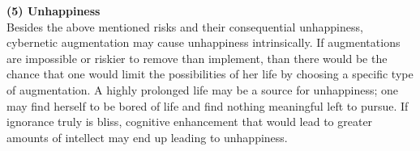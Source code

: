 \textbf{(5) Unhappiness} \\
Besides the above mentioned risks and their consequential unhappiness, cybernetic augmentation may cause unhappiness intrinsically. If augmentations are impossible or riskier to remove than implement, than there would be the chance that one would limit the possibilities of her life by choosing a specific type of augmentation. A highly prolonged life may be a source for unhappiness; one may find herself to be bored of life and find nothing meaningful left to pursue. If ignorance truly is bliss, cognitive enhancement that would lead to greater amounts of intellect may end up leading to unhappiness.




%
%
%	
%
%
